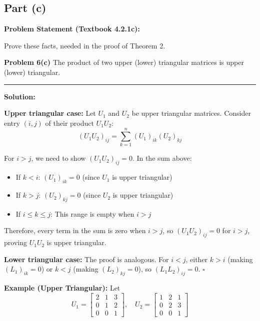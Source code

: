 \clearpage
\subsection*{Part (c)}

\textbf{Problem Statement (Textbook 4.2.1c):} 

Prove these facts, needed in the proof of Theorem 2.

\textbf{Problem 6(c)} The product of two upper (lower) triangular matrices is upper (lower) triangular.

\noindent\rule{\textwidth}{0.4pt}

\vspace{1em}

\textbf{Solution:}

\textbf{Upper triangular case:} Let $U_1$ and $U_2$ be upper triangular matrices. Consider entry $(i,j)$ of their product $U_1U_2$:
$$(U_1U_2)_{ij} = \sum_{k=1}^{n} (U_1)_{ik}(U_2)_{kj}$$

For $i > j$, we need to show $(U_1U_2)_{ij} = 0$. In the sum above:
\begin{itemize}
    \item If $k < i$: $(U_1)_{ik} = 0$ (since $U_1$ is upper triangular)
    \item If $k > j$: $(U_2)_{kj} = 0$ (since $U_2$ is upper triangular)
    \item If $i \leq k \leq j$: This range is empty when $i > j$
\end{itemize}

Therefore, every term in the sum is zero when $i > j$, so $(U_1U_2)_{ij} = 0$ for $i > j$, proving $U_1U_2$ is upper triangular.

\textbf{Lower triangular case:} The proof is analogous. For $i < j$, either $k > i$ (making $(L_1)_{ik} = 0$) or $k < j$ (making $(L_2)_{kj} = 0$), so $(L_1L_2)_{ij} = 0$. $\square$

\vspace{1em}

\textbf{Example (Upper Triangular):} Let 
$$U_1 = \begin{bmatrix} 2 & 1 & 3 \\ 0 & 1 & 2 \\ 0 & 0 & 1 \end{bmatrix}, \quad U_2 = \begin{bmatrix} 1 & 2 & 1 \\ 0 & 2 & 3 \\ 0 & 0 & 1 \end{bmatrix}$$

